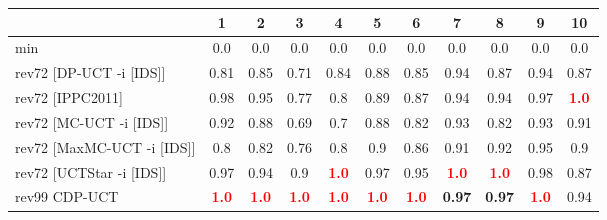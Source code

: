 \documentclass{article}
\begin{document}
\begin{tabular}{|l|r@{$\pm$}rr@{$\pm$}rr@{$\pm$}rr@{$\pm$}rr@{$\pm$}rr@{$\pm$}rr@{$\pm$}rr@{$\pm$}rr@{$\pm$}rr@{$\pm$}r|}
\hline

& \multicolumn{2}{c}{1}
& \multicolumn{2}{c}{2}
& \multicolumn{2}{c}{3}
& \multicolumn{2}{c}{4}
& \multicolumn{2}{c}{5}
& \multicolumn{2}{c}{6}
& \multicolumn{2}{c}{7}
& \multicolumn{2}{c}{8}
& \multicolumn{2}{c}{9}
& \multicolumn{2}{c|}{10}
\\
\hline
\hline
min
& \multicolumn{2}{c}{0.0}
& \multicolumn{2}{c}{0.0}
& \multicolumn{2}{c}{0.0}
& \multicolumn{2}{c}{0.0}
& \multicolumn{2}{c}{0.0}
& \multicolumn{2}{c}{0.0}
& \multicolumn{2}{c}{0.0}
& \multicolumn{2}{c}{0.0}
& \multicolumn{2}{c}{0.0}
& \multicolumn{2}{c|}{0.0}
\\
rev72 [DP-UCT -i [IDS]]
& \multicolumn{2}{c}{0.81}
& \multicolumn{2}{c}{0.85}
& \multicolumn{2}{c}{0.71}
& \multicolumn{2}{c}{0.84}
& \multicolumn{2}{c}{0.88}
& \multicolumn{2}{c}{0.85}
& \multicolumn{2}{c}{0.94}
& \multicolumn{2}{c}{0.87}
& \multicolumn{2}{c}{0.94}
& \multicolumn{2}{c|}{0.87}
\\
rev72 [IPPC2011]
& \multicolumn{2}{c}{0.98}
& \multicolumn{2}{c}{0.95}
& \multicolumn{2}{c}{0.77}
& \multicolumn{2}{c}{0.8}
& \multicolumn{2}{c}{0.89}
& \multicolumn{2}{c}{0.87}
& \multicolumn{2}{c}{0.94}
& \multicolumn{2}{c}{0.94}
& \multicolumn{2}{c}{0.97}
& \multicolumn{2}{c|}{\textbf{\textcolor{red}{1.0}}}
\\
rev72 [MC-UCT -i [IDS]]
& \multicolumn{2}{c}{0.92}
& \multicolumn{2}{c}{0.88}
& \multicolumn{2}{c}{0.69}
& \multicolumn{2}{c}{0.7}
& \multicolumn{2}{c}{0.88}
& \multicolumn{2}{c}{0.82}
& \multicolumn{2}{c}{0.93}
& \multicolumn{2}{c}{0.82}
& \multicolumn{2}{c}{0.93}
& \multicolumn{2}{c|}{0.91}
\\
rev72 [MaxMC-UCT -i [IDS]]
& \multicolumn{2}{c}{0.8}
& \multicolumn{2}{c}{0.82}
& \multicolumn{2}{c}{0.76}
& \multicolumn{2}{c}{0.8}
& \multicolumn{2}{c}{0.9}
& \multicolumn{2}{c}{0.86}
& \multicolumn{2}{c}{0.91}
& \multicolumn{2}{c}{0.92}
& \multicolumn{2}{c}{0.95}
& \multicolumn{2}{c|}{0.9}
\\
rev72 [UCTStar -i [IDS]]
& \multicolumn{2}{c}{0.97}
& \multicolumn{2}{c}{0.94}
& \multicolumn{2}{c}{0.9}
& \multicolumn{2}{c}{\textbf{\textcolor{red}{1.0}}}
& \multicolumn{2}{c}{0.97}
& \multicolumn{2}{c}{0.95}
& \multicolumn{2}{c}{\textbf{\textcolor{red}{1.0}}}
& \multicolumn{2}{c}{\textbf{\textcolor{red}{1.0}}}
& \multicolumn{2}{c}{0.98}
& \multicolumn{2}{c|}{0.87}
\\
\hline
rev99 CDP-UCT
& \multicolumn{2}{c}{\textbf{\textcolor{red}{1.0}}}
& \multicolumn{2}{c}{\textbf{\textcolor{red}{1.0}}}
& \multicolumn{2}{c}{\textbf{\textcolor{red}{1.0}}}
& \multicolumn{2}{c}{\textbf{\textcolor{red}{1.0}}}
& \multicolumn{2}{c}{\textbf{\textcolor{red}{1.0}}}
& \multicolumn{2}{c}{\textbf{\textcolor{red}{1.0}}}
& \multicolumn{2}{c}{\textbf{0.97}}
& \multicolumn{2}{c}{\textbf{0.97}}
& \multicolumn{2}{c}{\textbf{\textcolor{red}{1.0}}}
& \multicolumn{2}{c|}{0.94}
\\
\hline
\end{tabular}%
\end{document}
